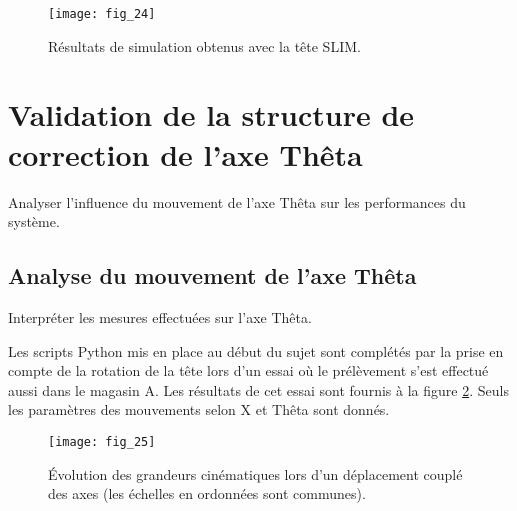 \begin{figure}
\centering
\texttt{[image: fig\_24]}

\caption{\label{fig:CCS_TSI_2021_fig_24}Résultats de simulation obtenus avec la tête SLIM.}
\end{figure}

\section{Validation de la structure de correction de l'axe Thêta}

\begin{obj}
Analyser l'influence du mouvement de l'axe Thêta sur les performances du système.
\end{obj}
\subsection{Analyse du mouvement de l'axe Thêta}

\begin{obj}
Interpréter les mesures effectuées sur l'axe Thêta.
\end{obj}

Les scripts Python mis en place au début du sujet sont complétés par la prise en compte de la rotation de la tête lors d'un essai où le prélèvement s'est effectué aussi dans le magasin A. Les résultats de cet essai sont fournis à la figure \ref{fig:CCS_TSI_2021_fig_25}. Seuls les paramètres des mouvements selon X et Thêta sont donnés.

\begin{figure}
\centering
\texttt{[image: fig\_25]}

\caption{\label{fig:CCS_TSI_2021_fig_25}Évolution des grandeurs cinématiques lors d'un déplacement couplé des axes (les échelles en ordonnées sont communes).}
\end{figure}


